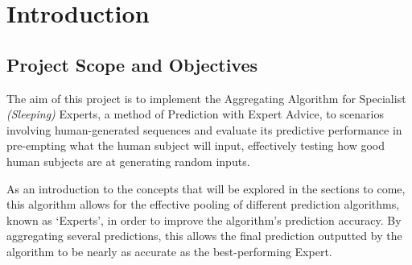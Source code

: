 \section{Introduction}\label{section:introduction}

\subsection{Project Scope and Objectives}
The aim of this project is to implement the Aggregating Algorithm for Specialist \textit{(Sleeping)} Experts, a method of Prediction with Expert Advice, to scenarios involving human-generated sequences and evaluate its predictive performance in pre-empting what the human subject will input, effectively testing how good human subjects are at generating random inputs.

As an introduction to the concepts that will be explored in the sections to come, this algorithm allows for the effective pooling of different prediction algorithms, known as `Experts', in order to improve the algorithm's prediction accuracy. By aggregating several predictions, this allows the final prediction outputted by the algorithm to be nearly as accurate as the best-performing Expert.

